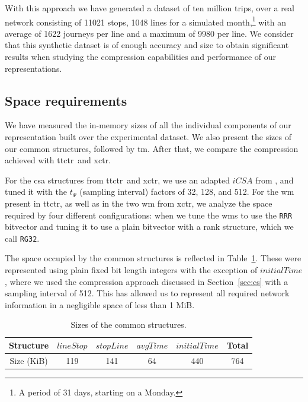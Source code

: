     With this approach we have generated a dataset of ten million trips, over a real network consisting of 11021 stops, 1048 lines for a simulated month,\footnote{A period of 31 days, starting on a Monday.} with an average of 1622 journeys per line and a maximum of 9980 per line. We consider that this synthetic dataset is of enough accuracy and size to obtain significant results when studying the compression capabilities and performance of our representations.
    
    \subsection{Space requirements}
    \label{sec:newctr:exp:space}
    We have measured the \mbox{in-memory} sizes of all the individual components of our representation built over the experimental dataset. We also present the sizes of our common structures, followed by \gls{tm}. After that, we compare the compression achieved with \gls{ttctr}~and \gls{xctr}.
    
    For the \gls{csa} structures from \gls{ttctr}~and \gls{xctr}, we use an adapted $iCSA$ from \cite{FBNCPR12}, and tuned it with the $t_\Psi$ (sampling interval) factors of 32, 128, and 512. For the \gls{wm} present in \gls{ttctr}, as well as in the two \gls{wm} from \gls{xctr}, we analyze the space required by four different configurations: when we tune the \gls{wm}s to use the \texttt{RRR} bitvector and tuning it to use 
    a plain bitvector with a rank structure, which we call \texttt{RG32}.
    
    The space occupied by the common structures is reflected in Table~\ref{tab:commons}. These were represented using plain fixed bit length integers with the exception of $initialTime$, where we used the compression approach discussed in Section~\ref{sec:cs} with a sampling interval of 512. This has allowed us to represent all required network information in a negligible space of less than 1 MiB.
    
    \begin{table}[ht]
        \centering
        \begin{tabular}{|c|c|c|c|c|c|}
        \hline
            Structure & $lineStop$ & $stopLine$ & $avgTime$ & $initialTime$ & Total \\
            \hline
            Size (KiB) & 119 & 141 & 64 & 440 & 764 \\
        \hline
        \end{tabular}
        
        \caption{Sizes of the common structures.}
        \label{tab:commons}
    \end{table}
    
